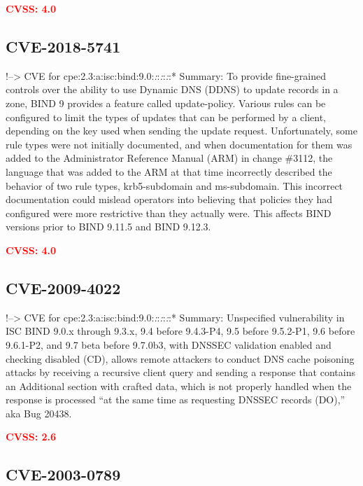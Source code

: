 \documentclass[a4paper, 12pt]{article}
\begin{document}
\textbf{\textcolor{red}{CVSS: 4.0}}

\hypertarget{cve-2018-5741}{%
\subsection{CVE-2018-5741}\label{cve-2018-5741}}

!--\textgreater{} CVE for
cpe:2.3:a:isc:bind:9.0:\emph{:}:\emph{:}:\emph{:}:* Summary: To provide
fine-grained controls over the ability to use Dynamic DNS (DDNS) to
update records in a zone, BIND 9 provides a feature called
update-policy. Various rules can be configured to limit the types of
updates that can be performed by a client, depending on the key used
when sending the update request. Unfortunately, some rule types were not
initially documented, and when documentation for them was added to the
Administrator Reference Manual (ARM) in change \#3112, the language that
was added to the ARM at that time incorrectly described the behavior of
two rule types, krb5-subdomain and ms-subdomain. This incorrect
documentation could mislead operators into believing that policies they
had configured were more restrictive than they actually were. This
affects BIND versions prior to BIND 9.11.5 and BIND 9.12.3.

\textbf{\textcolor{red}{CVSS: 4.0}}

\hypertarget{cve-2009-4022}{%
\subsection{CVE-2009-4022}\label{cve-2009-4022}}

!--\textgreater{} CVE for
cpe:2.3:a:isc:bind:9.0:\emph{:}:\emph{:}:\emph{:}:* Summary: Unspecified
vulnerability in ISC BIND 9.0.x through 9.3.x, 9.4 before 9.4.3-P4, 9.5
before 9.5.2-P1, 9.6 before 9.6.1-P2, and 9.7 beta before 9.7.0b3, with
DNSSEC validation enabled and checking disabled (CD), allows remote
attackers to conduct DNS cache poisoning attacks by receiving a
recursive client query and sending a response that contains an
Additional section with crafted data, which is not properly handled when
the response is processed ``at the same time as requesting DNSSEC
records (DO),'' aka Bug 20438.

\textbf{\textcolor{red}{CVSS: 2.6}}

\hypertarget{cve-2003-0789}{%
\subsection{CVE-2003-0789}\label{cve-2003-0789}}
\end{document}
